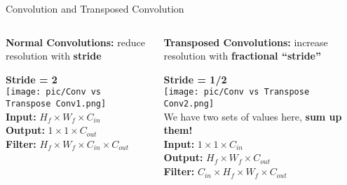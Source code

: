 \documentclass[serif, aspectratio=169]{beamer}
\begin{document}
\begin{frame}{Convolution and Transposed Convolution}
\small
\vspace{-0.3cm}

\begin{columns}[T]

    \begin{column}{0.5\textwidth}
        \textbf{Normal Convolutions:} reduce resolution with \textbf{stride}\\
        \begin{center}
            \textbf{Stride = 2}\\
            \texttt{[image: pic/Conv vs Transpose Conv1.png]}\\ 
            \vspace{0.75cm}
            \textbf{Input:} \( H_f \times W_f \times C_{in} \) \\
            \textbf{Output:} \( 1 \times 1 \times C_{out} \) \\
            \textbf{Filter:} \( H_f \times W_f \times C_{in} \times C_{out} \)
        \end{center}
    \end{column}

    \begin{column}{0.5\textwidth}
        \textbf{Transposed Convolutions:} increase resolution with \textbf{fractional ``stride''}\\
        \begin{center}
            \textbf{Stride = 1/2}\\
            \texttt{[image: pic/Conv vs Transpose Conv2.png]}\\ 
              \textcolor{deepblue}{We have two sets of values here,} \textbf{\textcolor{deepblue}{sum up them!}}\\
            \vspace{0.2cm}
            \textbf{Input:} \( 1 \times 1 \times C_{in} \) \\
            \textbf{Output:} \( H_f \times W_f \times C_{out} \) \\
            \textbf{Filter:} \( C_{in} \times H_f \times W_f \times C_{out} \)
        \end{center}
    \end{column}

\end{columns}

\end{frame}
\end{document}
